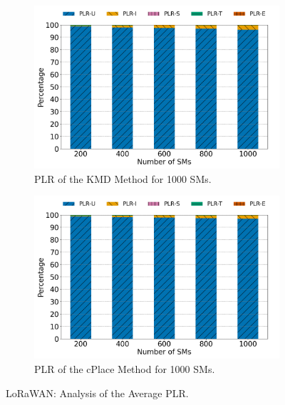 \documentclass[a4paper,fleqn]{cas-dc}
\begin{document}
\begin{figure}
    \centering
    \begin{subfigure}{0.48\textwidth}
        \centering
        \includegraphics[width=\linewidth]{imgs/kmd_plr.png}
        \caption{PLR of the KMD Method for 1000 \gls{SMs}.}
        \label{fig:kmd_plr}
    \end{subfigure}
    \hfill
    \begin{subfigure}{0.48\textwidth}
        \centering
        \includegraphics[width=\linewidth]{imgs/cplace_plr.png}
        \caption{PLR of the cPlace Method for 1000 \gls{SMs}.}
        \label{fig:cplace_plr}
    \end{subfigure}
    \caption{LoRaWAN: Analysis of the Average PLR.}
    \label{fig:plr}
\end{figure}
\end{document}
